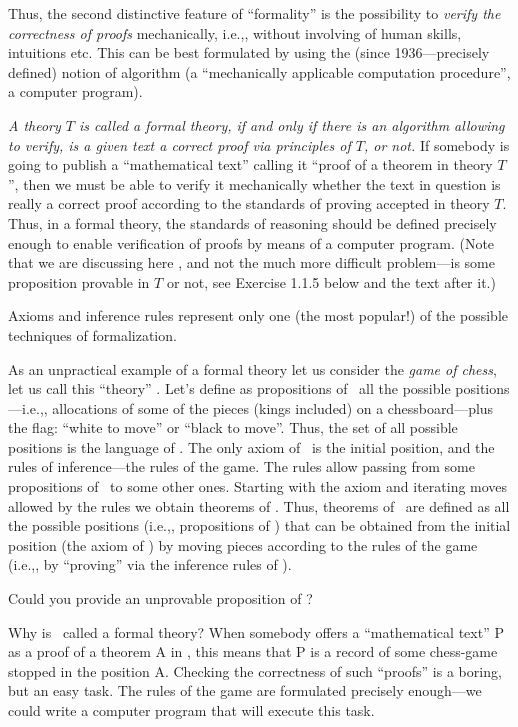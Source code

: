 Thus, the second distinctive feature of ``formality'' is the possibility to \emph{verify the correctness of proofs} mechanically, i.e.,, without involving of human skills, intuitions etc.
This can be best formulated by using the (since 1936---precisely defined) notion of algorithm (a ``mechanically applicable computation procedure'', a computer program).

\emph{A theory \(T\) is called a formal theory, if and only if there is an algorithm allowing to verify, is a given text a correct proof via principles of \(T\), or not.}
If somebody is going to publish a ``mathematical text'' calling it ``proof of a theorem in theory \(T\)'', then we must be able to verify it mechanically whether the text in question is really a correct proof according to the standards of proving accepted in theory \(T\).
Thus, in a formal theory, the standards of reasoning should be defined precisely enough to enable verification of proofs by means of a computer program.
(Note that we are discussing here , and not the much more difficult problem---is some proposition provable in \(T\) or not, see Exercise 1.1.5 below and the text after it.)

Axioms and inference rules represent only one (the most popular!) of the possible techniques of formalization.

As an unpractical example of a formal theory let us consider the \emph{game of chess}, let us call this ``theory'' \CHESS.
Let's define as propositions of \CHESS\ all the possible positions---i.e.,, allocations of some of the pieces (kings included) on a chessboard---plus the flag: ``white to move'' or ``black to move''.
Thus, the set of all possible positions is the language of \CHESS.
The only axiom of \CHESS\ is the initial position, and the rules of inference---the rules of the game.
The rules allow passing from some propositions of \CHESS\ to some other ones.
Starting with the axiom and iterating moves allowed by the rules we obtain theorems of \CHESS.
Thus, theorems of \CHESS\ are defined as all the possible positions (i.e.,, propositions of \CHESS) that can be obtained from the initial position (the axiom of \CHESS) by moving pieces according to the rules of the game (i.e.,, by ``proving'' via the inference rules of \CHESS).

\begin{exer}
Could you provide an unprovable proposition of \CHESS?
\end{exer}

Why is \CHESS\ called a formal theory? When somebody offers a ``mathematical text'' P as a proof of a theorem A in \CHESS, this means that P is a record of some chess-game stopped in the position A.
Checking the correctness of such ``proofs'' is a boring, but an easy task.
The rules of the game are formulated precisely enough---we could write a computer program that will execute this task.

